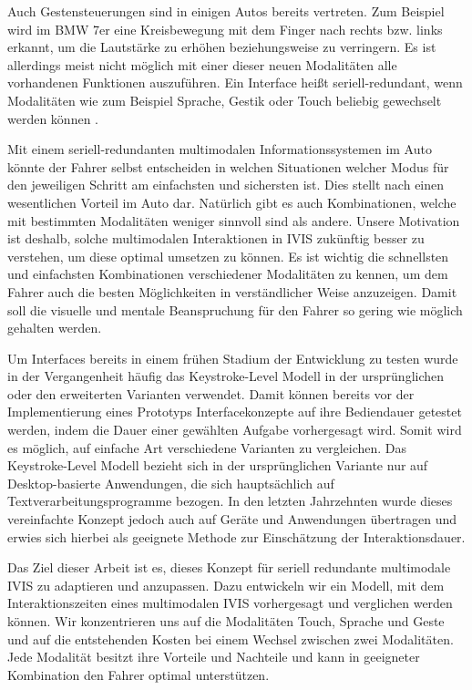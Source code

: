 Auch Gestensteuerungen sind in einigen Autos bereits vertreten.
Zum Beispiel wird im BMW 7er eine Kreisbewegung mit dem Finger nach rechts bzw. links erkannt, um die Lautstärke zu erhöhen beziehungsweise zu verringern. 
Es ist allerdings meist nicht möglich mit einer dieser neuen Modalitäten alle vorhandenen Funktionen auszuführen.
Ein Interface heißt seriell-redundant, wenn Modalitäten wie zum Beispiel Sprache, Gestik oder Touch beliebig gewechselt werden können \citep{neuss_2001}. 

Mit einem seriell-redundanten multimodalen Informationssystemen im Auto könnte der Fahrer selbst entscheiden in welchen Situationen welcher Modus für den jeweiligen Schritt am einfachsten und sichersten ist.
Dies stellt nach \citet{Muller_2011} einen wesentlichen Vorteil im Auto dar.
Natürlich gibt es auch Kombinationen, welche mit bestimmten Modalitäten weniger sinnvoll sind als andere.
Unsere Motivation ist deshalb, solche multimodalen Interaktionen in IVIS zukünftig besser zu verstehen, um diese optimal umsetzen zu können.
Es ist wichtig die schnellsten und einfachsten Kombinationen verschiedener Modalitäten zu kennen, um dem Fahrer auch die besten Möglichkeiten in verständlicher Weise anzuzeigen.
Damit soll die visuelle und mentale Beanspruchung für den Fahrer so gering wie möglich gehalten werden. 

Um Interfaces bereits in einem frühen Stadium der Entwicklung zu testen wurde in der Vergangenheit häufig das Keystroke-Level Modell in der ursprünglichen oder den erweiterten Varianten verwendet.
Damit können bereits vor der Implementierung eines Prototyps Interfacekonzepte auf ihre Bediendauer getestet werden, indem die Dauer einer gewählten Aufgabe vorhergesagt wird.
Somit wird es möglich, auf einfache Art verschiedene Varianten zu vergleichen.
Das Keystroke-Level Modell bezieht sich in der ursprünglichen Variante nur auf Desktop-basierte Anwendungen, die sich hauptsächlich auf Textverarbeitungsprogramme bezogen.
In den letzten Jahrzehnten wurde dieses vereinfachte Konzept jedoch auch auf Geräte und Anwendungen übertragen und erwies sich hierbei als geeignete Methode zur Einschätzung der Interaktionsdauer. 

Das Ziel dieser Arbeit ist es, dieses Konzept für seriell redundante multimodale IVIS zu adaptieren und anzupassen.
Dazu entwickeln wir ein Modell, mit dem Interaktionszeiten eines multimodalen IVIS vorhergesagt und verglichen werden können.
Wir konzentrieren uns auf die Modalitäten Touch, Sprache und Geste und auf die entstehenden Kosten bei einem Wechsel zwischen zwei Modalitäten.
Jede Modalität besitzt ihre Vorteile und Nachteile und kann in geeigneter Kombination den Fahrer optimal unterstützen.

